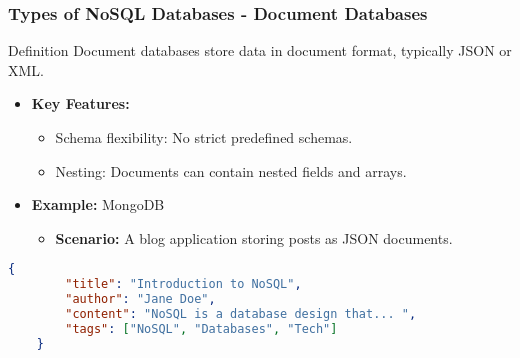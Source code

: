 \documentclass[aspectratio=169]{beamer}
\begin{document}
\begin{frame}[fragile]
    \frametitle{Types of NoSQL Databases - Document Databases}
    \begin{block}{Definition}
        Document databases store data in document format, typically JSON or XML.
    \end{block}

    \begin{itemize}
        \item \textbf{Key Features:}
        \begin{itemize}
            \item Schema flexibility: No strict predefined schemas.
            \item Nesting: Documents can contain nested fields and arrays.
        \end{itemize}
        
        \item \textbf{Example:} MongoDB
        \begin{itemize}
            \item \textbf{Scenario:} A blog application storing posts as JSON documents.
        \end{itemize}
    \end{itemize}

    \begin{lstlisting}[language=json]
    {
        "title": "Introduction to NoSQL",
        "author": "Jane Doe",
        "content": "NoSQL is a database design that... ",
        "tags": ["NoSQL", "Databases", "Tech"]
    }
    \end{lstlisting}
\end{frame}
\end{document}
